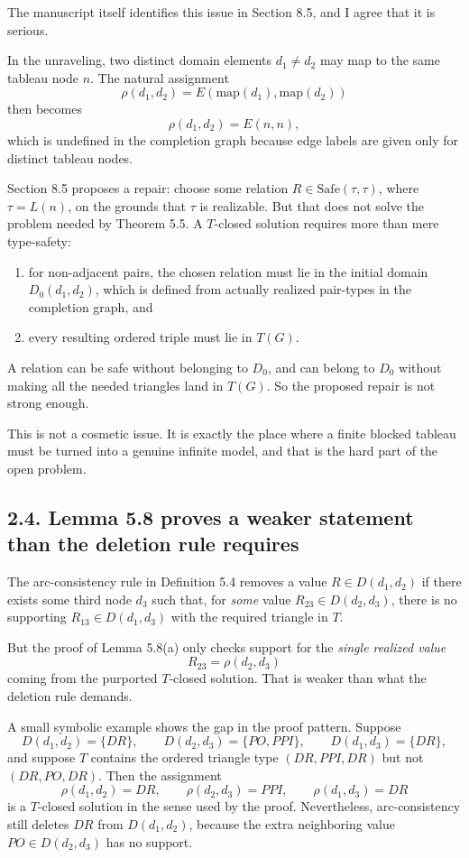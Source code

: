 \documentclass[11pt]{article}
\begin{document}
The manuscript itself identifies this issue in Section 8.5, and I agree that it is serious.

In the unraveling, two distinct domain elements \(d_1\neq d_2\) may map to the same tableau node \(n\). The natural assignment
\[
\rho(d_1,d_2)=E(\mathrm{map}(d_1),\mathrm{map}(d_2))
\]
then becomes
\[
\rho(d_1,d_2)=E(n,n),
\]
which is undefined in the completion graph because edge labels are given only for distinct tableau nodes.

Section 8.5 proposes a repair: choose some relation \(R\in \mathrm{Safe}(\tau,\tau)\), where \(\tau=L(n)\), on the grounds that \(\tau\) is realizable. But that does not solve the problem needed by Theorem 5.5. A \(T\)-closed solution requires more than mere type-safety:
\begin{enumerate}[leftmargin=1.5em,itemsep=0.25em]
\item for non-adjacent pairs, the chosen relation must lie in the initial domain \(D_0(d_1,d_2)\), which is defined from actually realized pair-types in the completion graph, and
\item every resulting ordered triple must lie in \(T(G)\).
\end{enumerate}
A relation can be safe without belonging to \(D_0\), and can belong to \(D_0\) without making all the needed triangles land in \(T(G)\). So the proposed repair is not strong enough.

This is not a cosmetic issue. It is exactly the place where a finite blocked tableau must be turned into a genuine infinite model, and that is the hard part of the open problem.

\subsection*{2.4. Lemma 5.8 proves a weaker statement than the deletion rule requires}

The arc-consistency rule in Definition 5.4 removes a value \(R\in D(d_1,d_2)\) if there exists some third node \(d_3\) such that, for \emph{some} value \(R_{23}\in D(d_2,d_3)\), there is no supporting \(R_{13}\in D(d_1,d_3)\) with the required triangle in \(T\).

But the proof of Lemma 5.8(a) only checks support for the \emph{single realized value}
\[
R_{23}=\rho(d_2,d_3)
\]
coming from the purported \(T\)-closed solution. That is weaker than what the deletion rule demands.

A small symbolic example shows the gap in the proof pattern. Suppose
\[
D(d_1,d_2)=\{DR\},\qquad D(d_2,d_3)=\{PO,PPI\},\qquad D(d_1,d_3)=\{DR\},
\]
and suppose \(T\) contains the ordered triangle type \((DR,PPI,DR)\) but not \((DR,PO,DR)\). Then the assignment
\[
\rho(d_1,d_2)=DR,\qquad \rho(d_2,d_3)=PPI,\qquad \rho(d_1,d_3)=DR
\]
is a \(T\)-closed solution in the sense used by the proof. Nevertheless, arc-consistency still deletes \(DR\) from \(D(d_1,d_2)\), because the extra neighboring value \(PO\in D(d_2,d_3)\) has no support.
\end{document}
